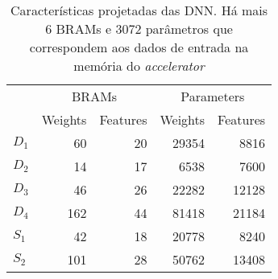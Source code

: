 \begin{table}[ht!]
\centering
\caption{Características projetadas das DNN. Há mais 6 BRAMs e 3072 parâmetros que correspondem aos dados de entrada na memória do \textit{accelerator}}
\label{tab:5-dnn-report}
\begin{tabular}{lrrrr}
\toprule
 & \multicolumn{2}{c}{BRAMs} & \multicolumn{2}{c}{Parameters} \\
\cmidrule(r){2-3} \cmidrule(l){4-5}
 & Weights & Features & Weights & Features \\
\midrule
$D_1$ & 60 & 20 & 29354 & 8816 \\
$D_2$ & 14 & 17 & 6538 & 7600 \\
$D_3$ & 46 & 26 & 22282 & 12128 \\
$D_4$ & 162 & 44 & 81418 & 21184 \\
$S_1$ & 42 & 18 & 20778 & 8240 \\
$S_2$ & 101 & 28 & 50762 & 13408 \\
\bottomrule
\end{tabular}
\end{table}